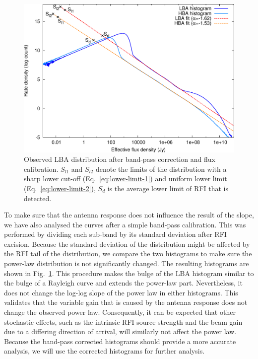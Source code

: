 \documentclass[useAMS,usenatbib]{mn2e}
\begin{document}
\begin{figure}
\begin{center}
\includegraphics[width=13cm]{img/histograms-corrected-trimmed}
\caption{Observed LBA distribution after band-pass correction and flux calibration. $S_{l1}$ and $S_{l2}$ denote the limits of the distribution with a sharp lower cut-off (Eq.~\eqref{eq:lower-limit-1}) and uniform lower limit (Eq.~\eqref{eq:lower-limit-2}), $S_d$ is the average lower limit of RFI that is detected.}
\label{fig:histogram-passband-corrected}
\end{center}
\end{figure}

To make sure that the antenna response does not influence the result of the slope, we have also analysed the curves after a simple band-pass calibration. This was performed by dividing each sub-band by its standard deviation after RFI excision. Because the standard deviation of the distribution might be affected by the RFI tail of the distribution, we compare the two histograms to make sure the power-law distribution is not significantly changed. The resulting histograms are shown in Fig.~\ref{fig:histogram-passband-corrected}. This procedure makes the bulge of the LBA histogram similar to the bulge of a Rayleigh curve and extends the power-law part. Nevertheless, it does not change the log-log slope of the power law in either histograms. This validates that the variable gain that is caused by the antenna response does not change the observed power law. Consequently, it can be expected that other stochastic effects, such as the intrinsic RFI source strength and the beam gain due to a differing direction of arrival, will similarly not affect the power law. Because the band-pass corrected histograms should provide a more accurate analysis, we will use the corrected histograms for further analysis.
\end{document}
